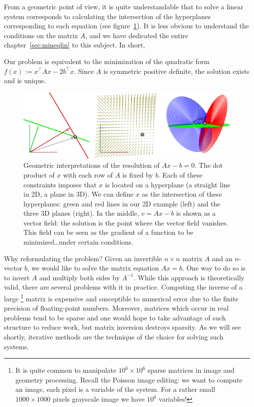 \documentclass[notitlepage,oneside]{book}
\begin{document}
From a geometric point of view, it is quite understandable that to solve a linear system corresponds to calculating the intersection of
the hyperplanes corresponding to each equation (see figure~\ref{fig:pbd2d}).
It is less obvious to understand the conditions on the matrix $A$, and we have dedicated the entire chapter~\ref{sec:mineqlin} to this subject.
In short,
\begin{framed}
Our problem is equivalent to the minimization of the quadratic form $f(x):=x^\top Ax-2b^\top x$. Since $A$ is symmetric positive definite, the solution exists and is unique.
\end{framed}

\begin{figure}[htb]
  \centering
  \includegraphics[width=.8\linewidth]{cg/problem2d.png}
  \caption{Geometric interpretations of the resolution of $Ax-b=0$.
  The dot product of $x$ with each row of $A$ is fixed by $b$.
  Each of these constraints imposes that $x$ is located on a hyperplane (a straight line in 2D, a plane in 3D).
  We can define $x$ as the intersection of these hyperplanes: green and red lines in our 2D example (left) and the three 3D planes (right).
  In the middle, $v=Ax-b$ is shown as a vector field: the solution is the point where the vector field vanishes.
  This field can be seen as  the gradient of a function to be minimized\dots under certain conditions.}
  \label{fig:pbd2d}
\end{figure}


Why reformulating the problem?
Given an invertible $n \times n$ matrix $A$ and an $n$-vector $b$, we would like to solve the matrix equation $Ax = b$.
One way to do so is to invert $A$ and multiply both sides by $A^{-1}$.
While this approach is theoretically valid, there are several problems with it in practice. Computing the inverse of a large
\footnote{It is quite common to manipulate $10^6\times 10^6$ sparse matrices in image and geometry processing.
Recall the Poisson image editing: we want to compute an image, each pixel is a variable of the system. For a rather small $1000\times 1000$ pixels grayscale image we have $10^6$ variables!}
matrix is expensive and susceptible to numerical error due to the finite precision of floating-point numbers.
Moreover, matrices which occur in real problems tend to be sparse and one would hope to take advantage of such structure to reduce
work, but matrix inversion destroys sparsity.
As we will see shortly, iterative methods are the technique of the choice for solving such systems.
\end{document}
